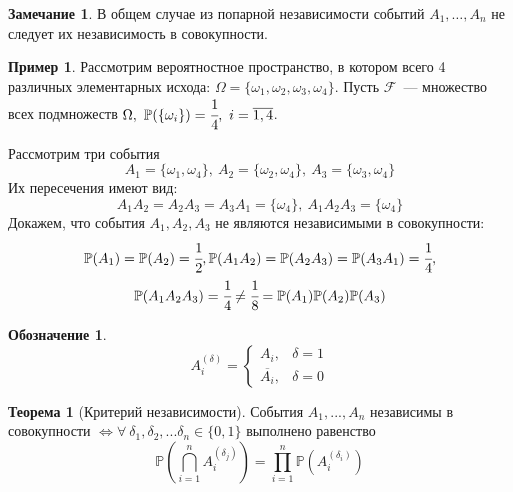 \documentclass[oneside,final,14pt]{extreport}
\newcommand\myprob[1]{{\mathbb{P}(#1)}}
\theoremstyle{plain}
\theoremstyle{definition}
\newtheorem*{exmp}{Пример}
\newtheorem*{symb}{Обозначение}
\newtheorem*{rmrk}{Замечание}
\theoremstyle{named}
\newtheorem*{namedthm}{Теорема}
\begin{document}
\begin{rmrk}
    В общем случае из попарной независимости событий $A_1, \ldots, A_n$ не следует их независимость в совокупности.
    \begin{exmp}
        Рассмотрим вероятностное пространство, в котором всего 4 различных элементарных исхода: $\Omega = \{ \omega_1, \omega_2, \omega_3, \omega_4 \}$. Пусть $\mathcal{F}$~--- множество всех подмножеств $\Omega,~\myprob{\{\omega_i\}} = \cfrac{1}{4},~i = \overline{1,4}$.
        
        Рассмотрим три события 
        \begin{equation*}
            A_1 = \{ \omega_1, \omega_4 \},~ 
            A_2 = \{ \omega_2, \omega_4 \},~
            A_3 = \{ \omega_3, \omega_4 \}
        \end{equation*}
        Их пересечения имеют вид:
        \begin{equation*}
            A_1A_2 = A_2A_3 = A_3A_1 = \{ \omega_4 \},~
            A_1A_2A_3 = \{ \omega_4 \}
        \end{equation*}
        Докажем, что события $A_1, A_2, A_3$ не являются независимыми в совокупности:
        \begin{gather*}
            \myprob{A_1} = \myprob{A_2} = \cfrac{1}{2}, \myprob{A_1A_2} = \myprob{A_2A_3} = \myprob{A_3A_1} = \cfrac{1}{4}, \\ \myprob{A_1A_2A_3} = \cfrac{1}{4} \neq \cfrac{1}{8} = \myprob{A_1}\myprob{A_2}\myprob{A_3}
        \end{gather*}
    \end{exmp}
\end{rmrk}

\begin{symb}
    \begin{equation*}
        A_{i}^{(\delta)}=\left\{\begin{array}{ll}A_{i}, & \delta=1 \\ \overline{A_{i}}, & \delta=0\end{array}\right.
    \end{equation*}
\end{symb}

\begin{namedthm}[Критерий независимости]
    События $A_1, ..., A_n$ независимы в совокупности $\Leftrightarrow \forall ~ \delta_1, \delta_2, ... \delta_n \in \{0, 1\}$ выполнено равенство
    \begin{equation*}
        \myprob{\bigcap_{i=1}^{n} A_{i}^{\left(\delta_{j}\right)}}=\prod_{i=1}^{n}\myprob{A_{i}^{\left(\delta_{i}\right)}}
    \end{equation*}
\end{namedthm}
\end{document}
